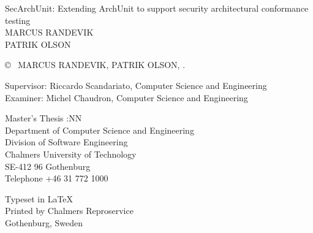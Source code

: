 \newpage
\thispagestyle{plain}
\vspace*{4.5cm}
SecArchUnit: Extending ArchUnit to support security architectural conformance testing\\
MARCUS RANDEVIK\\
PATRIK OLSON \setlength{\parskip}{1cm}

\copyright ~ MARCUS RANDEVIK, PATRIK OLSON, \the\year. \setlength{\parskip}{1cm}

Supervisor: Riccardo Scandariato, Computer Science and Engineering\\
Examiner: Michel Chaudron, Computer Science and Engineering \setlength{\parskip}{1cm}

Master's Thesis \the\year:NN\\	%
Department of Computer Science and Engineering\\
Division of Software Engineering\\
Chalmers University of Technology\\
SE-412 96 Gothenburg\\
Telephone +46 31 772 1000 \setlength{\parskip}{0.5cm}

\vfill

Typeset in \LaTeX \tagtemp\\
Printed by Chalmers Reproservice\\
Gothenburg, Sweden \the\year

